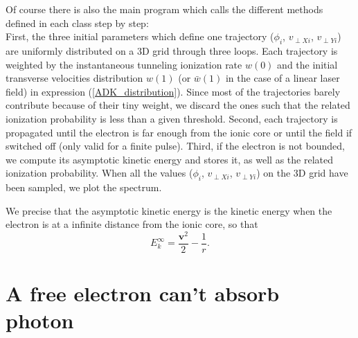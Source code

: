 \documentclass[a4paper]{article}
\begin{document}
\par
Of course there is also the main program which calls the different methods defined in each class step by step: \\
First, the three initial parameters which define one trajectory ($\phi_{i}$, $v_{\perp X i}$, $v_{\perp Y i}$) are uniformly distributed on a 3D grid through three loops. Each trajectory is weighted by the instantaneous tunneling ionization rate $w (0)$ and the initial transverse velocities distribution $w (1)$ (or $\bar w(1)$ in the case of a linear laser field) in expression (\ref{ADK_distribution}). Since most of the trajectories barely contribute because of their tiny weight, we discard the ones such that the related ionization probability is less than a given threshold.
Second, each trajectory is propagated until the electron is far enough from the ionic core or until the field if switched off (only valid for a finite pulse). 
Third, if the electron is not bounded, we compute its asymptotic kinetic energy and stores it, as well as the related ionization probability.
When all the values ($\phi_{i}$, $v_{\perp X i}$, $v_{\perp Y i}$) on the 3D grid have been sampled, we plot the spectrum.
\par 
We precise that the asymptotic kinetic energy is the kinetic energy when the electron is at a infinite distance from the ionic core, so that
\begin{equation}
\label{asymptotic_kinetic_energy}
E_{k}^{\infty}=\frac{\mathbf{v}^{2}}{2}-\frac{1}{r}.
\end{equation}

\section{A free electron can't absorb photon}
\label{free_electron}
\end{document}
